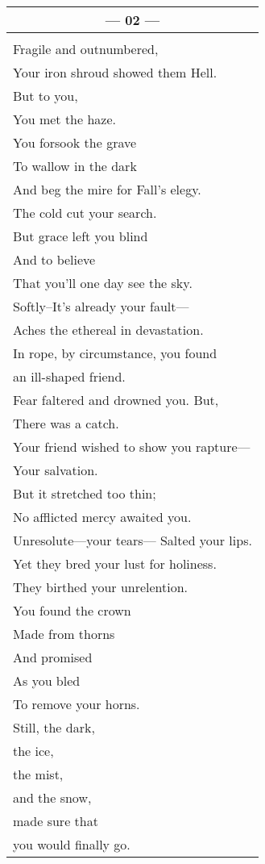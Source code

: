 \documentclass{article}
\begin{document}
\begin{center}
\begin{tabular}{l}
\multicolumn{1}{c}{\textbf{--- 02 ---}} \\ \hline
\\
Fragile and outnumbered, \\
Your iron shroud showed them Hell. \\
But to you, \\
You met the haze. \\
You forsook the grave \\
To wallow in the dark \\
And beg the mire for Fall's elegy. \\
The cold cut your search. \\
But grace left you blind \\
And to believe \\
That you'll one day see the sky. \\
Softly--It's already your fault--- \\
Aches the ethereal in devastation. \\
In rope, by circumstance, you found \\
an ill-shaped friend. \\
Fear faltered and drowned you. But, \\
There was a catch. \\
Your friend wished to show you rapture--- \\
Your salvation. \\
But it stretched too thin; \\
No afflicted mercy awaited you. \\
Unresolute---your tears---
Salted your lips. \\
Yet they bred your lust for holiness. \\
They birthed your unrelention. \\
You found the crown \\
Made from thorns \\
And promised \\
As you bled \\
To remove your horns. \\
Still, the dark, \\
the ice, \\
the mist, \\
and the snow, \\
made sure that \\
you would finally go. \\

\end{tabular}
\end{center}
\end{document}
